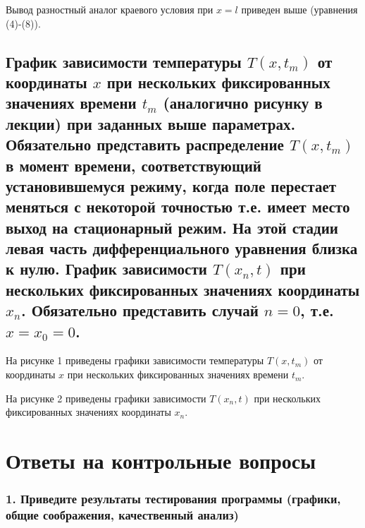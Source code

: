 Вывод разностный аналог краевого условия при $x = l$ приведен выше (уравнения (4)-(8)).


\subsection*{График зависимости температуры $T(x, t_m)$ от координаты $x$ при нескольких фиксированных значениях времени $t_m$ (аналогично рисунку в лекции) при заданных выше параметрах. Обязательно представить распределение $T(x, t_m)$ в момент  времени, соответствующий установившемуся режиму, когда поле перестает меняться с некоторой точностью т.е.  имеет  место выход на  стационарный режим. На этой стадии левая часть дифференциального уравнения близка к нулю. График зависимости $T(x_n, t)$ при нескольких фиксированных значениях координаты $x_n$. Обязательно представить случай $n = 0$, т.е. $x = x_0 = 0$.}

На рисунке 1 приведены графики зависимости температуры $T(x, t_m)$ от координаты $x$ при нескольких фиксированных значениях времени $t_m$.



На рисунке 2 приведены графики зависимости $T(x_n, t)$ при нескольких фиксированных значениях координаты $x_n$.








\section*{Ответы на контрольные вопросы}

\subsubsection{1. Приведите  результаты тестирования  программы (графики, общие соображения, качественный анализ)}

